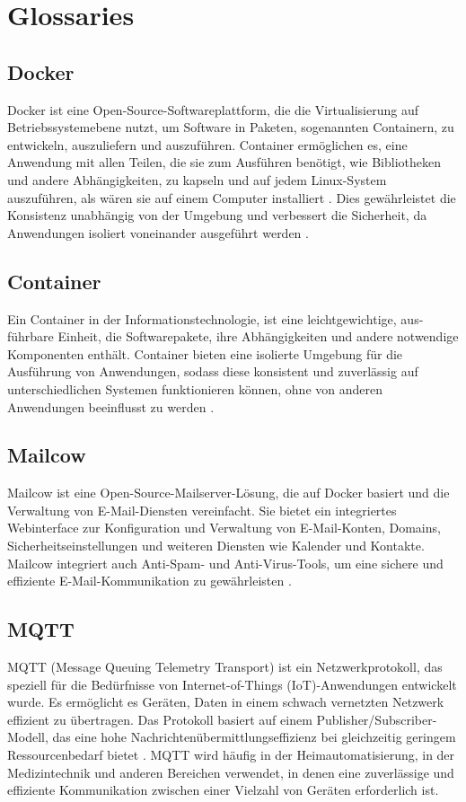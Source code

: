\clearpage
\section{Glossaries}

\subsection{Docker}
\label{subsec:docker}
Docker ist eine Open-Source-Softwareplattform, die die Virtualisierung auf Betriebssystemebene nutzt, um Software in Paketen, sogenannten Containern, zu entwickeln, auszuliefern und auszuführen. Container ermöglichen es, eine Anwendung mit allen Teilen, die sie zum Ausführen benötigt, wie Bibliotheken und andere Abhängigkeiten, zu kapseln und auf jedem Linux-System auszuführen, als wären sie auf einem Computer installiert \cite{Aerisdocker} . Dies gewährleistet die Konsistenz unabhängig von der Umgebung und verbessert die Sicherheit, da Anwendungen isoliert voneinander ausgeführt werden \cite{Docker}.

\subsection{Container}
\label{subsec:container}
Ein Container in der Informationstechnologie, ist eine leichtgewichtige, aus-führbare Einheit, die Softwarepakete, ihre Abhängigkeiten und andere notwendige Komponenten enthält. Container bieten eine isolierte Umgebung für die Ausführung von Anwendungen, sodass diese konsistent und zuverlässig auf unterschiedlichen Systemen funktionieren können, ohne von anderen Anwendungen beeinflusst zu werden \cite{Container}.

\subsection{Mailcow}
\label{subsec:mailcow}
Mailcow ist eine Open-Source-Mailserver-Lösung, die auf Docker basiert und die Verwaltung von E-Mail-Diensten vereinfacht. Sie bietet ein integriertes Webinterface zur Konfiguration und Verwaltung von E-Mail-Konten, Domains, Sicherheitseinstellungen und weiteren Diensten wie Kalender und Kontakte. Mailcow integriert auch Anti-Spam- und Anti-Virus-Tools, um eine sichere und effiziente E-Mail-Kommunikation zu gewährleisten \cite{Mailcow}.

\subsection{MQTT}
\label{subsec:mqtt}
MQTT (Message Queuing Telemetry Transport) ist ein Netzwerkprotokoll, das speziell für die Bedürfnisse von Internet-of-Things (IoT)-Anwendungen entwickelt wurde. Es ermöglicht es Geräten, Daten in einem schwach vernetzten Netzwerk effizient zu übertragen. Das Protokoll basiert auf einem Publisher/Subscriber-Modell, das eine hohe Nachrichtenübermittlungseffizienz bei gleichzeitig geringem Ressourcenbedarf bietet \cite{MQTT}. MQTT wird häufig in der Heimautomatisierung, in der Medizintechnik und anderen Bereichen verwendet, in denen eine zuverlässige und effiziente Kommunikation zwischen einer Vielzahl von Geräten erforderlich ist.

